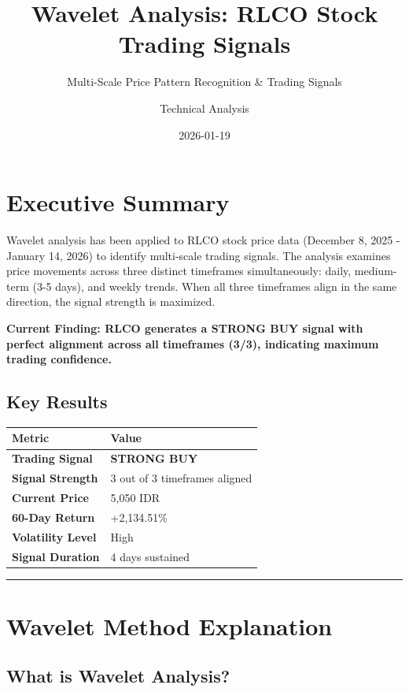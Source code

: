 \documentclass[
  11pt,
]{article}
\title{Wavelet Analysis: RLCO Stock Trading Signals}
\subtitle{Multi-Scale Price Pattern Recognition \& Trading Signals}
\author{Technical Analysis}
\date{2026-01-19}
\begin{document}
\maketitle


\section{Executive Summary}\label{executive-summary}

Wavelet analysis has been applied to RLCO stock price data (December 8,
2025 - January 14, 2026) to identify multi-scale trading signals. The
analysis examines price movements across three distinct timeframes
simultaneously: daily, medium-term (3-5 days), and weekly trends. When
all three timeframes align in the same direction, the signal strength is
maximized.

\textbf{Current Finding: RLCO generates a STRONG BUY signal with perfect
alignment across all timeframes (3/3), indicating maximum trading
confidence.}

\subsection{Key Results}\label{key-results}

\begin{longtable}[]{@{}ll@{}}
\toprule\noalign{}
Metric & Value \\
\midrule\noalign{}
\endhead
\bottomrule\noalign{}
\endlastfoot
\textbf{Trading Signal} & \textbf{STRONG BUY} \\
\textbf{Signal Strength} & 3 out of 3 timeframes aligned \\
\textbf{Current Price} & 5,050 IDR \\
\textbf{60-Day Return} & +2,134.51\% \\
\textbf{Volatility Level} & High \\
\textbf{Signal Duration} & 4 days sustained \\
\end{longtable}

\begin{center}\rule{0.5\linewidth}{0.5pt}\end{center}

\section{Wavelet Method Explanation}\label{wavelet-method-explanation}

\subsection{What is Wavelet Analysis?}\label{what-is-wavelet-analysis}
\end{document}
